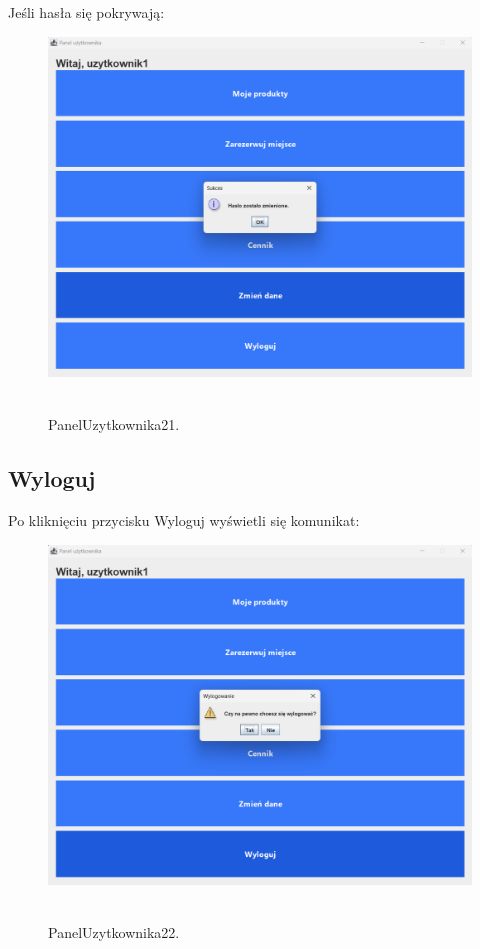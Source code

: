 Jeśli hasła się pokrywają:
\begin{figure}[H]
    \centering
    \includegraphics[width=.7\linewidth]{figures/PanelUzytkownika21.png}\
    \caption{PanelUzytkownika21.\label{PanelUzytkownika21}}
\end{figure}
\clearpage
\subsection{Wyloguj}
\label{subsec:Wyloguj}
Po kliknięciu przycisku Wyloguj wyświetli się komunikat:
\begin{figure}[H]
    \centering
    \includegraphics[width=.7\linewidth]{figures/PanelUzytkownika22.png}\
    \caption{PanelUzytkownika22.\label{PanelUzytkownika22}}
\end{figure}
\clearpage
